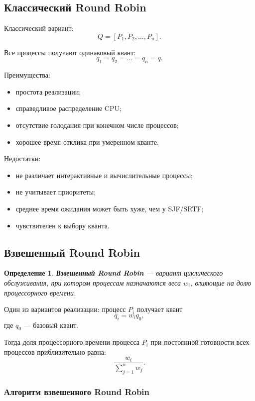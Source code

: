 \documentclass[12pt,a4paper]{article}
\newtheorem{definition}{Определение}
\begin{document}
\subsection{Классический Round Robin}

Классический вариант:
\[
Q = [P_1,P_2,\ldots,P_n].
\]

Все процессы получают одинаковый квант:
\[
q_1 = q_2 = \ldots = q_n = q.
\]

Преимущества:
\begin{itemize}
    \item простота реализации;
    \item справедливое распределение CPU;
    \item отсутствие голодания при конечном числе процессов;
    \item хорошее время отклика при умеренном кванте.
\end{itemize}

Недостатки:
\begin{itemize}
    \item не различает интерактивные и вычислительные процессы;
    \item не учитывает приоритеты;
    \item среднее время ожидания может быть хуже, чем у SJF/SRTF;
    \item чувствителен к выбору кванта.
\end{itemize}

\subsection{Взвешенный Round Robin}

\begin{definition}
\textbf{Взвешенный Round Robin} --- вариант циклического обслуживания, при котором процессам назначаются веса $w_i$, влияющие на долю процессорного времени.
\end{definition}

Один из вариантов реализации: процесс $P_i$ получает квант
\[
q_i = w_i q_0,
\]
где $q_0$ --- базовый квант.

Тогда доля процессорного времени процесса $P_i$ при постоянной готовности всех процессов приблизительно равна:
\[
\frac{w_i}{\sum_{j=1}^{n} w_j}.
\]

\subsubsection{Алгоритм взвешенного Round Robin}
\end{document}
